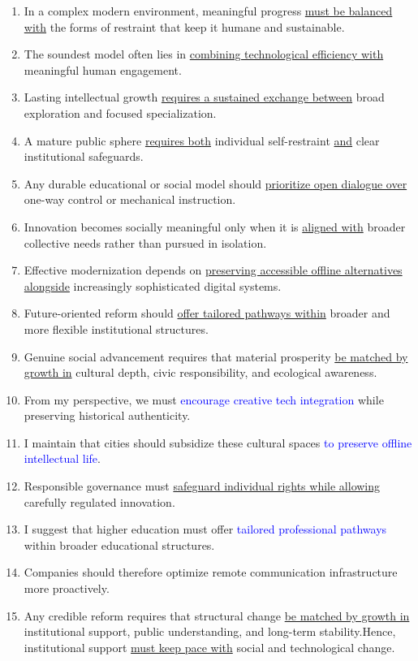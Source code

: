 \begin{enumerate}
    \item In a complex modern environment, meaningful progress \underline{must be balanced with} the forms of restraint that keep it humane and sustainable.
    \item The soundest model often lies in \underline{combining technological efficiency with} meaningful human engagement.
    \item Lasting intellectual growth \underline{requires a sustained exchange between} broad exploration and focused specialization.
    \item A mature public sphere \underline{requires both} individual self-restraint \underline{and} clear institutional safeguards.
    \item Any durable educational or social model should \underline{prioritize open dialogue over} one-way control or mechanical instruction.
    \item Innovation becomes socially meaningful only when it is \underline{aligned with} broader collective needs rather than pursued in isolation.
    \item Effective modernization depends on \underline{preserving accessible offline alternatives alongside} increasingly sophisticated digital systems.
    \item Future-oriented reform should \underline{offer tailored pathways within} broader and more flexible institutional structures.
    \item Genuine social advancement requires that material prosperity \underline{be matched by growth in} cultural depth, civic responsibility, and ecological awareness.
    \item From my perspective, we must \textcolor{blue}{encourage creative tech integration} while preserving historical authenticity. 
    \item I maintain that cities should subsidize these cultural spaces \textcolor{blue}{to preserve offline intellectual life}. 
    \item Responsible governance must \underline{safeguard individual rights while allowing} carefully regulated innovation.
    \item I suggest that higher education must offer \textcolor{blue}{tailored professional pathways} within broader educational structures. 
    \item Companies should therefore optimize remote communication infrastructure more proactively. 
    \item Any credible reform requires that structural change \underline{be matched by growth in} institutional support, public understanding, and long-term stability.Hence, institutional support \underline{must keep pace with} social and technological change.
  
\end{enumerate}

